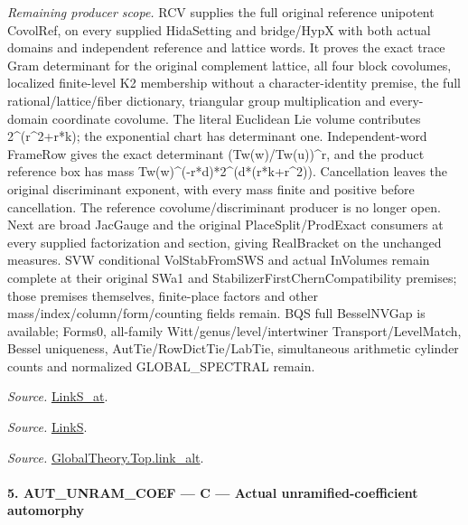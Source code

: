 \documentclass[11pt,a4paper]{article}
\numberwithin{equation}{section}
\theoremstyle{remark}\newtheorem{remark}[theorem]{Remark}
\begin{document}
\emph{Remaining producer scope.} RCV supplies the full original reference unipotent CovolRef, on every supplied HidaSetting and bridge/HypX with both actual domains and independent reference and lattice words. It proves the exact trace Gram determinant for the original complement lattice, all four block covolumes, localized finite-level K2 membership without a character-identity premise, the full rational/lattice/fiber dictionary, triangular group multiplication and every-domain coordinate covolume. The literal Euclidean Lie volume contributes 2\textasciicircum{}(r\textasciicircum{}2+r*k); the exponential chart has determinant one. Independent-word FrameRow gives the exact determinant (Tw(w)/Tw(u))\textasciicircum{}r, and the product reference box has mass Tw(w)\textasciicircum{}(-r*d)*2\textasciicircum{}(d*(r*k+r\textasciicircum{}2)). Cancellation leaves the original discriminant exponent, with every mass finite and positive before cancellation. The reference covolume/discriminant producer is no longer open. Next are broad JacGauge and the original PlaceSplit/ProdExact consumers at every supplied factorization and section, giving RealBracket on the unchanged measures. SVW conditional VolStabFromSWS and actual InVolumes remain complete at their original SWa1 and StabilizerFirstChernCompatibility premises; those premises themselves, finite-place factors and other mass/index/column/form/counting fields remain. BQS full BesselNVGap is available; Forms0, all-family Witt/genus/level/intertwiner Transport/LevelMatch, Bessel uniqueness, AutTie/RowDictTie/LabTie, simultaneous arithmetic cylinder counts and normalized GLOBAL\_\allowbreak SPECTRAL remain.

\emph{Source.} \href{https://github.com/CocoSgt/riemann-hypothesis-lean/blob/7cbf7a0c32fca1badf05931879a37c3f8a2b03b4/src/Formalism/SharpRestriction/GlobalTheoremInputs.lean#L145-L149}{LinkS\_\allowbreak at}.

\emph{Source.} \href{https://github.com/CocoSgt/riemann-hypothesis-lean/blob/7cbf7a0c32fca1badf05931879a37c3f8a2b03b4/src/Formalism/SharpRestriction/GlobalTheoremInputs.lean#L152-L157}{LinkS}.

\emph{Source.} \href{https://github.com/CocoSgt/riemann-hypothesis-lean/blob/7cbf7a0c32fca1badf05931879a37c3f8a2b03b4/src/Development/AbelianVarietyTheory/Proofs/GlobalInterpolation/LinkAlt.lean#L16-L50}{GlobalTheory.Top.link\_\allowbreak alt}.



\paragraph{5. AUT\_\allowbreak UNRAM\_\allowbreak COEF — C — Actual unramified-coefficient automorphy}
\end{document}
